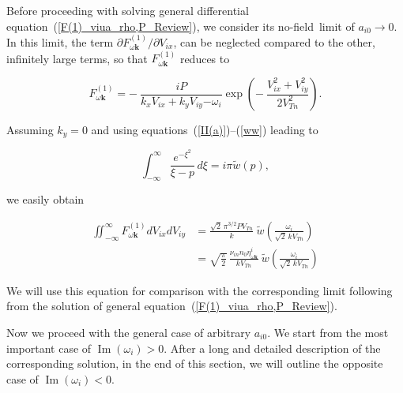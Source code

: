 \documentclass[draft]{agujournal2019}
\renewcommand{\vec}{\mathbf}
\begin{document}
{Before proceeding with solving general differential equation~(\ref{F(1)_viua_rho,P_Review}), we
consider its no-field\ limit of $a_{i0}\rightarrow0$. In this limit, the term
$\partial F_{\omega\vec{k}}^{(1)}/\partial V_{ix}$, can be neglected compared
to the other, infinitely large terms, so that $F_{\omega\vec{k}}^{(1)}$
reduces to
\begin{linenomath*}
\[
F_{\omega\vec{k}}^{(1)}=-\ \frac{iP}{k_{x}V_{ix}+k_{y}V_{iy}\mathbf{-}\omega_{i}}\exp
\left(  -\ \frac{V_{ix}^{2}+V_{iy}^{2}}{2V_{Tn}^{2}}\right)  .
\]
\end{linenomath*}
Assuming $k_{y}=0$ and using equations~(\ref{II(a)})--(\ref{ww}) leading to
\begin{linenomath*}
\[
\int_{-\infty}^{\infty}\frac{e^{-\xi^{2}}}{\xi-p}\,d\xi=i\pi \tilde{w}(p),
\]
\end{linenomath*}
we easily obtain
\begin{linenomath*}
\begin{align}
\iint_{-\infty}^{\infty}F_{\omega\vec{k}}^{(1)}dV_{ix}dV_{iy}  &
=\frac{\sqrt{2}\,\pi^{3/2}PV_{Tn}}{k}\ \tilde{w}\left(  \frac{\omega_{i}}{\sqrt{2}\,kV_{Tn}%
}\right) \nonumber\\
&  =\sqrt{\frac{\pi}{2}}\,\frac{\nu_{in}n_{0}\eta_{\omega\vec{k}}^{i}}{kV_{Tn}%
}\ \tilde{w}\left(  \frac{\omega_{i}}{\sqrt{2}\,kV_{Tn}}\right)  
\label{Int_F^1_classical}
\end{align}
\end{linenomath*}
We will use this equation for comparison with the corresponding limit
following from the solution of general equation\ (\ref{F(1)_viua_rho,P_Review}).

Now we proceed with the general case of arbitrary $a_{i0}$. We start from the most important case of $\operatorname{Im}(\omega_i)>0$. 
After a long and detailed description of the corresponding solution, in the end of this section, we will outline the opposite case of $\operatorname{Im}(\omega_i)<0$.

}
\end{document}
